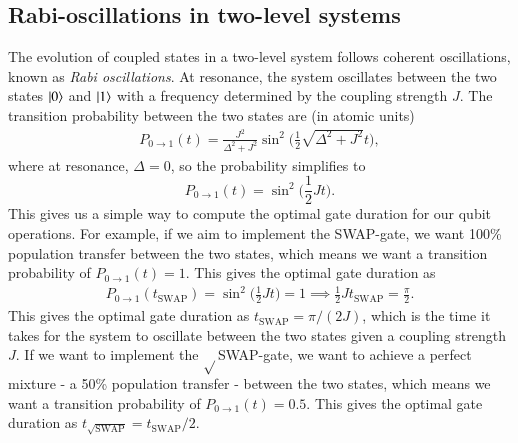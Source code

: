 \documentclass{subfiles}
\begin{document}
\subsection{Rabi-oscillations in two-level systems}
The evolution of coupled states in a two-level system follows coherent oscillations, known as \emph{Rabi oscillations}\cite{nielsen2010quantum, sakurai1986modern}. At resonance, the system oscillates between the two states $\ket{0}$ and $\ket{1}$ with a frequency determined by the coupling strength $J$. The transition probability between the two states are (in atomic units)
\begin{align*}
    P_{0\to1}(t) = \frac{J^2}{\Delta^2 + J^2}\sin^2\bigg(\frac{1}{2}\sqrt{\Delta^2 + J^2}t\bigg),
\end{align*} 
where at resonance, $\Delta = 0$, so the probability simplifies to
\begin{equation}
    P_{0\to1}(t) = \sin^2\bigg(\frac{1}{2}Jt\bigg).\label{eq:rabi_oscillation}
\end{equation}
This gives us a simple way to compute the optimal gate duration for our qubit operations. For example, if we aim to implement the SWAP-gate, we want 100\% population transfer between the two states, which means we want a transition probability of $P_{0\to1}(t) = 1$. This gives the optimal gate duration as
\begin{align*}
    P_{0\to1}(t_{\text{SWAP}}) = \sin^2\bigg(\frac{1}{2}Jt\bigg) = 1 \implies \frac{1}{2}Jt_{\text{SWAP}} = \frac{\pi}{2}.
\end{align*}
This gives the optimal gate duration as $t_{\text{SWAP}} = \pi/ (2 J)$, which is the time it takes for the system to oscillate between the two states given a coupling strength $J$. If we want to implement the $\sqrt{}$SWAP-gate, we want to achieve a perfect mixture - a 50\% population transfer - between the two states, which means we want a transition probability of $P_{0\to1}(t) = 0.5$. This gives the optimal gate duration as $t_{\sqrt{\text{SWAP}}} =  t_{\text{SWAP}}/2$.
\end{document}
